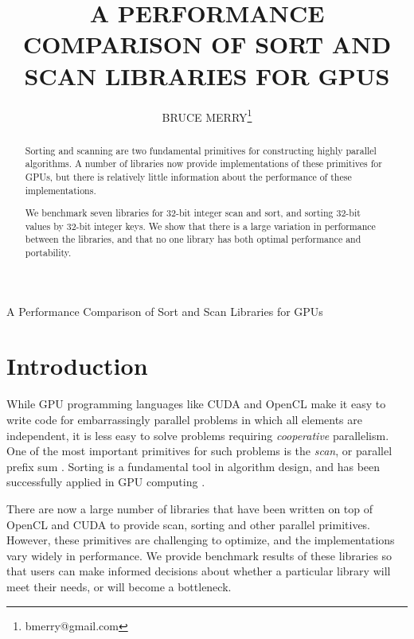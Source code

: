\documentclass{ws-ppl}
\begin{document}
{A Performance Comparison of Sort and Scan Libraries for GPUs}

\catchline{}{}{}{}{}


\title{A PERFORMANCE COMPARISON OF SORT AND SCAN LIBRARIES FOR GPUS}

\author{BRUCE MERRY\footnote{bmerry@gmail.com}}

\address{Department of Computer Science, University of Cape Town, South
Africa}

\maketitle

\begin{history}
\end{history}

\begin{abstract}
Sorting and scanning are two fundamental primitives for constructing highly
parallel algorithms. A number of libraries now provide implementations of
these primitives for GPUs, but there is relatively little information about
the performance of these implementations.

We benchmark seven libraries for 32-bit integer scan and sort, and sorting
32-bit values by 32-bit integer keys. We show that there is a large
variation in performance between the libraries, and that no one library has
both optimal performance and portability.
\end{abstract}


\section{Introduction}
While GPU programming languages like CUDA \cite{cuda} and OpenCL \cite{opencl} make it easy to write
code for embarrassingly parallel problems in which all elements are
independent, it is less easy to solve problems requiring \emph{cooperative}
parallelism. One of the most important primitives for such problems is the
\emph{scan}, or parallel prefix sum \cite{blelloch-scan}. Sorting is a
fundamental tool in algorithm design, and has been successfully applied in GPU
computing \cite{owens-gpgpu}.

There are now a large number of libraries that have been written on top of
OpenCL and CUDA to provide scan, sorting and other parallel primitives. However, these
primitives are challenging to optimize, and the implementations vary widely in
performance. We provide benchmark results of these libraries so that users can make
informed decisions about whether a particular library will meet their needs,
or will become a bottleneck.
\end{document}
